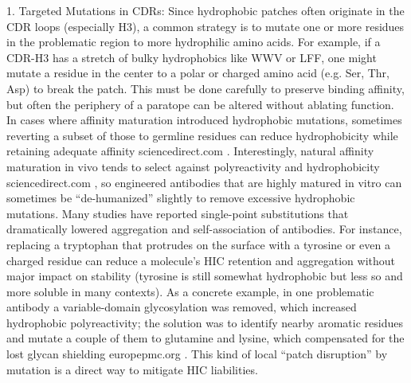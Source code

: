 \documentclass[12pt]{article}
\begin{document}
1. Targeted Mutations in CDRs: Since hydrophobic patches often originate in the CDR loops (especially H3), a common strategy is to mutate one or more residues in the problematic region to more hydrophilic amino acids. For example, if a CDR-H3 has a stretch of bulky hydrophobics like WWV or LFF, one might mutate a residue in the center to a polar or charged amino acid (e.g. Ser, Thr, Asp) to break the patch. This must be done carefully to preserve binding affinity, but often the periphery of a paratope can be altered without ablating function. In cases where affinity maturation introduced hydrophobic mutations, sometimes reverting a subset of those to germline residues can reduce hydrophobicity while retaining adequate affinity
sciencedirect.com
. Interestingly, natural affinity maturation in vivo tends to select against polyreactivity and hydrophobicity
sciencedirect.com
, so engineered antibodies that are highly matured in vitro can sometimes be “de-humanized” slightly to remove excessive hydrophobic mutations. Many studies have reported single-point substitutions that dramatically lowered aggregation and self-association of antibodies. For instance, replacing a tryptophan that protrudes on the surface with a tyrosine or even a charged residue can reduce a molecule’s HIC retention and aggregation without major impact on stability (tyrosine is still somewhat hydrophobic but less so and more soluble in many contexts). As a concrete example, in one problematic antibody a variable-domain glycosylation was removed, which increased hydrophobic polyreactivity; the solution was to identify nearby aromatic residues and mutate a couple of them to glutamine and lysine, which compensated for the lost glycan shielding
europepmc.org
. This kind of local “patch disruption” by mutation is a direct way to mitigate HIC liabilities.
\end{document}
